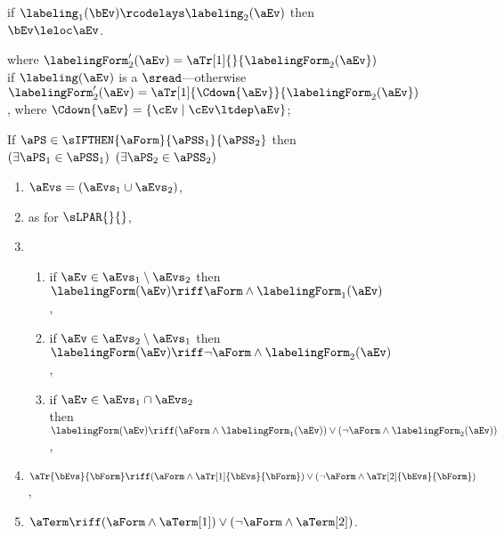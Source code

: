 \begin{figure}
\begin{multicols}{2}
\begin{enumerate}[topsep=0pt,label=(\textsc{s}\arabic*),ref=\textsc{s}\arabic*]
\begin{enumerate}[leftmargin=0pt]
        if $\labeling_1(\bEv)\rcodelays\labeling_2(\aEv)$
        then $\bEv\leloc\aEv$.
      \end{enumerate}
    \end{enumerate}
  \end{multicols}
  where
  $\labelingForm'_2(\aEv)=\aTr[1]{}{\labelingForm_2(\aEv})$ if $\labeling(\aEv)$ is a $\sread$---otherwise
  $\labelingForm'_2(\aEv)=\aTr[1]{\Cdown{\aEv}}{\labelingForm_2(\aEv})$, where
  $\Cdown{\aEv}=\{ \cEv \mid \cEv \ltdep \aEv \}$;
  \medskip

  \noindent
  If $\aPS \in \sIFTHEN{\aForm}{\aPSS_1}{\aPSS_2}$ then
  $(\exists\aPS_1\in\aPSS_1)$ $(\exists\aPS_2\in\aPSS_2)$
  \begin{multicols}{2}
    \begin{enumerate}[topsep=0pt,label=(\textsc{i}\arabic*),ref=\textsc{i}\arabic*]
    \item \label{if-E}
      $\aEvs = (\aEvs_1\cup\aEvs_2)$,
    \item \label{if-lambda}
       as for $\sLPAR{}{}$,
    \item[] \setcounter{enumi}{\value{kappa}} 
      \begin{enumerate}[leftmargin=0pt]
      \item \label{if-kappa1}
        if $\aEv\in\aEvs_1\setminus\aEvs_2$ then $\labelingForm(\aEv) \riff \aForm\land\labelingForm_1(\aEv)$,
      \item \label{if-kappa2}
        if $\aEv\in\aEvs_2\setminus\aEvs_1$ then $\labelingForm(\aEv) \riff \neg\aForm\land\labelingForm_2(\aEv)$, 
      \item \label{if-kappa12}
        if $\aEv\in\aEvs_1\cap\aEvs_2$\\ then
        $\labelingForm(\aEv) \riff (\aForm\land\labelingForm_1(\aEv))\lor(\neg\aForm\land\labelingForm_2(\aEv))$,
      \end{enumerate}
    \item \label{if-tau}
      $\aTr{\bEvs}{\bForm} \riff (\aForm\land\aTr[1]{\bEvs}{\bForm})\lor(\neg\aForm\land\aTr[2]{\bEvs}{\bForm})$,
    \item \label{if-term}
      $\aTerm \riff (\aForm\land\aTerm[1])\lor(\neg\aForm\land\aTerm[2])$.
    \end{enumerate}
  \end{multicols}
  \medskip


\end{figure}
